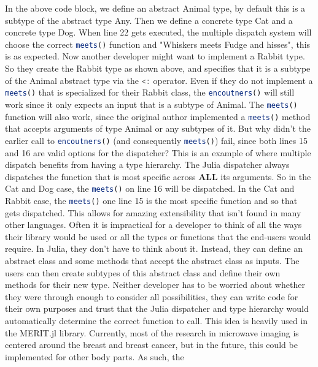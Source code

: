 In the above code block, we define an abstract Animal type, by default this is a subtype of the abstract type Any. Then
we define a concrete type Cat and a concrete type Dog. When line 22 gets executed, the multiple dispatch system will
choose the correct \lstinline[language=Julia]|meets()| function and "Whiskers meets Fudge and hisses", this is as expected. Now another developer
might want to implement a Rabbit type. So they create the Rabbit type as shown above, and specifies that it is a subtype
of the Animal abstract type via the \lstinline[language=Julia]{<:} operator. Even if they do not implement a
\lstinline[language=Julia]{meets()} that is specialized for their Rabbit class, the
\lstinline[language=Julia]{encoutners()} will still work since it only expects an input that is a subtype of Animal. The
\lstinline[language=Julia]{meets()} function will also work, since the original author implemented a
\lstinline[language=Julia]{meets()} method that accepts arguments of type Animal or any subtypes of it. But why didn't
the earlier call to \lstinline[language=Julia]{encoutners()} (and consequently \lstinline[language=Julia]{meets()})
fail, since both lines 15 and 16 are valid options for the dispatcher? This is an example of where multiple dispatch
benefits from having a type hierarchy. The Julia dispatcher always dispatches the function that is most specific across
\textbf{ALL} its arguments. So in the Cat and Dog case, the \lstinline[language=Julia]{meets()} on line 16 will be
dispatched. In the Cat and Rabbit case, the \lstinline[language=Julia]{meets()} one line 15 is the most specific
function and so that gets dispatched. This allows for amazing extensibility that isn't found in many other languages. Often
it is impractical for a developer to think of all the ways their library would be used or all the types or functions
that the end-users would require. In Julia, they don't have to think about it. Instead, they can define an abstract
class and some methods that accept the abstract class as inputs. The users can then create subtypes of this abstract
class and define their own methods for their new type. Neither developer has to be worried about whether they were through
enough to consider all possibilities, they can write code for their own purposes and trust that the Julia dispatcher and
type hierarchy would automatically determine the correct function to call. \hfill \break
This idea is heavily used in the MERIT.jl library. Currently, most of the research in microwave imaging is centered
around the breast and breast cancer, but in the future, this could be implemented for other body parts. As such, the
